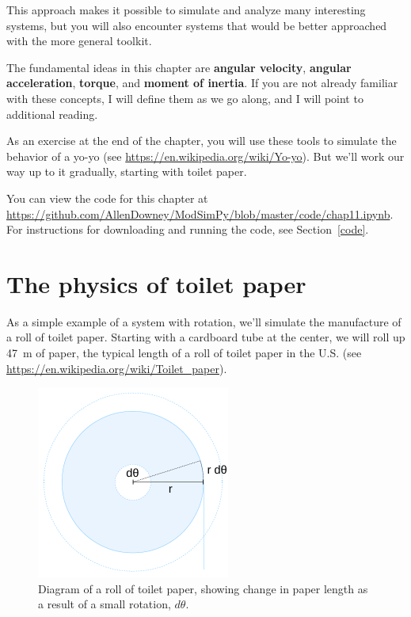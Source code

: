 \documentclass[12pt]{book}
\theoremstyle{exercise}
\begin{document}
This approach makes it possible to simulate and analyze many interesting systems, but you will also encounter systems that would be better approached with the more general toolkit.

The fundamental ideas in this chapter are {\bf angular velocity}, {\bf angular acceleration}, {\bf torque}, and {\bf moment of inertia}.  If you are not already familiar with these concepts, I will define them as we go along, and I will point to additional reading.

As an exercise at the end of the chapter, you will use these tools to simulate the behavior of a yo-yo (see \url{https://en.wikipedia.org/wiki/Yo-yo}).  But we'll work our way up to it gradually, starting with toilet paper.

You can view the code for this chapter at \url{https://github.com/AllenDowney/ModSimPy/blob/master/code/chap11.ipynb}.  For instructions for downloading and running the code, see Section~\ref{code}.


\section{The physics of toilet paper}
\label{paper}

As a simple example of a system with rotation, we'll simulate the manufacture of a roll of toilet paper.  Starting with a cardboard tube at the center, we will roll up \SI{47}{\meter} of paper, the typical length of a roll of toilet paper in the U.S. (see \url{https://en.wikipedia.org/wiki/Toilet_paper}).

\begin{figure}
\centerline{\includegraphics[height=2.5in]{figs/paper_roll.pdf}}
\caption{Diagram of a roll of toilet paper, showing change in paper length as a result of a small rotation, $d\theta$.}
\label{paper_roll}
\end{figure}
\end{document}
